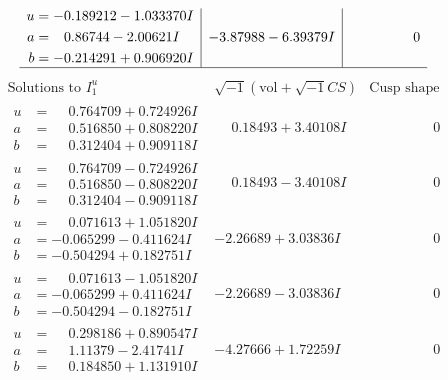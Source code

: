\documentclass[1p]{elsarticle_modified}
\theoremstyle{definition}
\newcommand{\I}{\sqrt{-1}}
\begin{document}
$$\begin{array}{c|c|c}
\begin{aligned}
u &= -0.189212 - 1.033370 I \\
a &= \phantom{-}0.86744 - 2.00621 I \\
b &= -0.214291 + 0.906920 I\end{aligned}
 & -3.87988 - 6.39379 I & \phantom{-0.000000 } 0\\
 \hline 
 \end{array}$$\newpage$$\begin{array}{c|c|c}  
\text{Solutions to }I^u_{1}& \I (\text{vol} + \sqrt{-1}CS) & \text{Cusp shape}\\
 \hline 
\begin{aligned}
u &= \phantom{-}0.764709 + 0.724926 I \\
a &= \phantom{-}0.516850 + 0.808220 I \\
b &= \phantom{-}0.312404 + 0.909118 I\end{aligned}
 & \phantom{-}0.18493 + 3.40108 I & \phantom{-0.000000 } 0 \\ \hline\begin{aligned}
u &= \phantom{-}0.764709 - 0.724926 I \\
a &= \phantom{-}0.516850 - 0.808220 I \\
b &= \phantom{-}0.312404 - 0.909118 I\end{aligned}
 & \phantom{-}0.18493 - 3.40108 I & \phantom{-0.000000 } 0 \\ \hline\begin{aligned}
u &= \phantom{-}0.071613 + 1.051820 I \\
a &= -0.065299 - 0.411624 I \\
b &= -0.504294 + 0.182751 I\end{aligned}
 & -2.26689 + 3.03836 I & \phantom{-0.000000 } 0 \\ \hline\begin{aligned}
u &= \phantom{-}0.071613 - 1.051820 I \\
a &= -0.065299 + 0.411624 I \\
b &= -0.504294 - 0.182751 I\end{aligned}
 & -2.26689 - 3.03836 I & \phantom{-0.000000 } 0 \\ \hline\begin{aligned}
u &= \phantom{-}0.298186 + 0.890547 I \\
a &= \phantom{-}1.11379 - 2.41741 I \\
b &= \phantom{-}0.184850 + 1.131910 I\end{aligned}
 & -4.27666 + 1.72259 I & \phantom{-0.000000 } 0 \\ \hline\begin{aligned}

\end{aligned}
\end{array}$$
\end{document}
